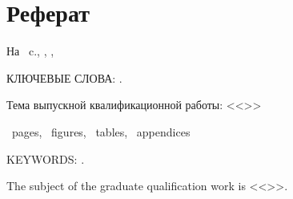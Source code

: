 \chapter*[Count-me]{Реферат} %
\thispagestyle{empty}%
%
%



На ~c.,  
,
,

{\MakeUppercase{Ключевые слова: \keywordsRu}.}

Тема выпускной квалификационной работы: <<\thesisTitle>>

\abstractRu %

\clearpage


\printTheAbstract %


~pages, 
~figures, 
~tables,
~appendices%

{\MakeUppercase{Keywords: \keywordsEn}.} %
	
The subject of the graduate qualification work is <<\thesisTitleEn>>.
	
	
\abstractEn %

	


\thispagestyle{empty}
%
